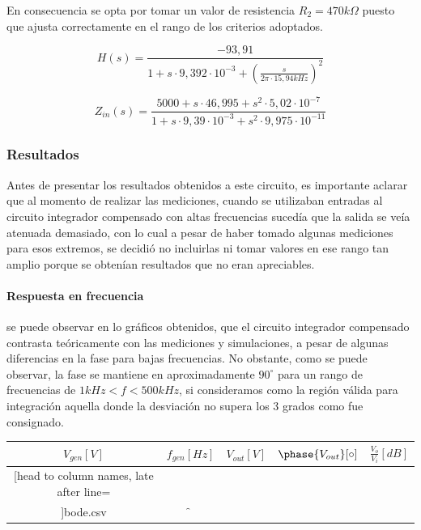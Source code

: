 En consecuencia se opta por tomar un valor de resistencia $R_2 = 470k\Omega$ puesto que ajusta correctamente en el rango de los criterios adoptados.

\begin{equation}
	H(s) = \frac{-93,91}{1 + s \cdot 9,392 \cdot 10^{-3} + \left( \frac{s}{2 \pi \cdot 15,94kHz} \right)^{2}}
\end{equation}

\begin{equation}
	Z_{in}(s) = \frac{5000 + s \cdot 46,995 + s^{2} \cdot 5,02 \cdot 10^{-7}}{1 + s \cdot 9,39 \cdot 10^{-3} + s^{2} \cdot 9,975 \cdot 10^{-11}}
\end{equation}

	\subsubsection{Resultados}
Antes de presentar los resultados obtenidos a este circuito, es importante aclarar que al momento de realizar las mediciones, cuando se utilizaban entradas
al circuito integrador compensado con altas frecuencias suced\'ia que la salida se ve\'ia atenuada demasiado, con lo cual a pesar de haber tomado algunas mediciones 
para esos extremos, se decidi\'o no incluirlas ni tomar valores en ese rango tan amplio porque se obten\'ian resultados que no eran apreciables.

\paragraph*{Respuesta en frecuencia} se puede observar en lo gr\'aficos obtenidos, que el circuito integrador compensado
contrasta te\'oricamente con las mediciones y simulaciones, a pesar de algunas diferencias en la fase para bajas frecuencias. No obstante,
como se puede observar, la fase se mantiene en aproximadamente $90^{\circ}$ para un rango de frecuencias de $ 1kHz < f < 500kHz $, si consideramos como
la regi\'on v\'alida para integraci\'on aquella donde la desviaci\'on no supera los 3 grados como fue consignado.

\begin{table}[H]
	\centering
	\begin{tabular}{c c c c c}%
		$V_{gen} [V]$ & $f_{gen} [Hz]$ & $V_{out} [V]$ & $\phase{V_{out}} [\circ]$ & $\frac{V_o}{V_i} [dB]$ \\ \hline
		\csvreader[head to column names, late after line=\\]{bode.csv}{}{\in & \f & \out & \p & \db}
		\hline
	\end{tabular}
\end{table}

